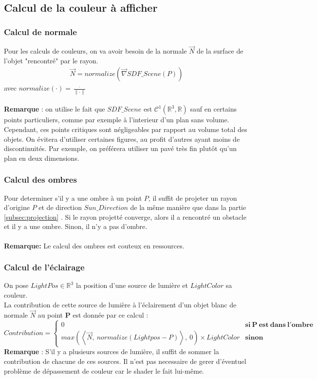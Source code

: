 \newpage
\subsection{Calcul de la couleur à afficher}
\subsubsection{Calcul de normale}
Pour les calculs de couleurs, on va avoir besoin de la normale $\Vec{N}$ de la surface de l'objet "rencontré" par le rayon.
\begin{align*}
    \Vec{N}=normalize(\Vec{\nabla}SDF\_Scene(P))
\end{align*}
avec $normalize(\cdot )=\frac{\cdot }{\|\cdot \|}$\\
\\
\textbf{Remarque} : on utilise le fait que $SDF\_Scene$ est $\mathcal{C}^1(\mathbb{R}^3,\mathbb{R})$ sauf en certains points particuliers, comme par exemple à l'interieur d'un plan sans volume. Cependant, ces points critiques sont négligeables par rapport au volume total des objets. On évitera d'utiliser certaines figures, au profit d'autres ayant moins de discontinuités. Par exemple, on préférera utiliser un pavé très fin plutôt qu'un plan en deux dimensions.

\subsubsection{Calcul des ombres}
Pour determiner s'il y a une ombre à un point $P$, il suffit de projeter un rayon d'origine $P$ et de direction $Sun\_Direction$ de la même manière que dans la partie \ref{subsec:projection} . Si le rayon projetté converge, alors il a rencontré un obstacle et il y a une ombre. Sinon, il n'y a pas d'ombre.\\
\\\textbf{Remarque:} Le calcul des ombres est couteux en ressources.

\subsubsection{Calcul de l'éclairage}
On pose $LightPos \in \mathbb{R}^3$ la position d'une source de lumière et $LightColor$ sa couleur.
\\La contribution de cette source de lumière à l'éclairement d'un objet blanc de normale $\Vec{N}$ au point $\mathbf{P}$ est donnée par ce calcul :
$$
    Contribution=\left\{
        \begin{array}{ll}
            0 & \mathbf{si\ P\ est\ dans\ l'ombre} \\
            max(\left\langle \Vec{N},\ normalize(Lightpos-P) \right\rangle,\ 0) \times LightColor & \mathbf{sinon}
        \end{array}
    \right.
$$
\textbf{Remarque} : S'il y a plusieurs sources de lumière, il suffit de sommer la contribution de chacune de ces sources. Il n'est pas necessaire de gerer d'éventuel problème de dépassement de couleur car le shader le fait lui-même.


